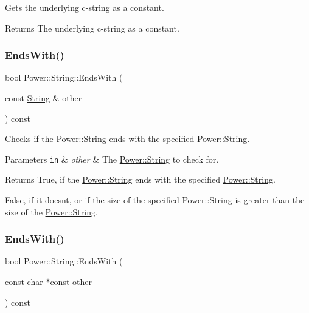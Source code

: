 Gets the underlying c-\/string as a constant. 

\begin{DoxyReturn}{Returns}
The underlying c-\/string as a constant. 
\end{DoxyReturn}
\mbox{\label{class_power_1_1_string_ae936d98f4be00ce5b901a561cac63ab0}} 
\subsubsection{\texorpdfstring{Ends\+With()}{EndsWith()}\hspace{0.1cm}{\footnotesize\ttfamily [1/4]}}
{\footnotesize\ttfamily bool Power\+::\+String\+::\+Ends\+With (\begin{DoxyParamCaption}\item[{const \hyperlink{class_power_1_1_string}{String} \&}]{other }\end{DoxyParamCaption}) const\hspace{0.3cm}{\ttfamily [inline]}}



Checks if the \hyperlink{class_power_1_1_string}{Power\+::\+String} ends with the specified \hyperlink{class_power_1_1_string}{Power\+::\+String}. 


\begin{DoxyParams}[1]{Parameters}
\mbox{\tt in}  & {\em other} & The \hyperlink{class_power_1_1_string}{Power\+::\+String} to check for. \\
\hline
\end{DoxyParams}
\begin{DoxyReturn}{Returns}
True, if the \hyperlink{class_power_1_1_string}{Power\+::\+String} ends with the specified \hyperlink{class_power_1_1_string}{Power\+::\+String}. 

False, if it doesn\textquotesingle{}t, or if the size of the specified \hyperlink{class_power_1_1_string}{Power\+::\+String} is greater than the size of the \hyperlink{class_power_1_1_string}{Power\+::\+String}. 
\end{DoxyReturn}
\mbox{\label{class_power_1_1_string_a007514d96b8e99416e0c10f6b72675c5}} 
\subsubsection{\texorpdfstring{Ends\+With()}{EndsWith()}\hspace{0.1cm}{\footnotesize\ttfamily [2/4]}}
{\footnotesize\ttfamily bool Power\+::\+String\+::\+Ends\+With (\begin{DoxyParamCaption}\item[{const char $\ast$const}]{other }\end{DoxyParamCaption}) const\hspace{0.3cm}{\ttfamily [inline]}}



